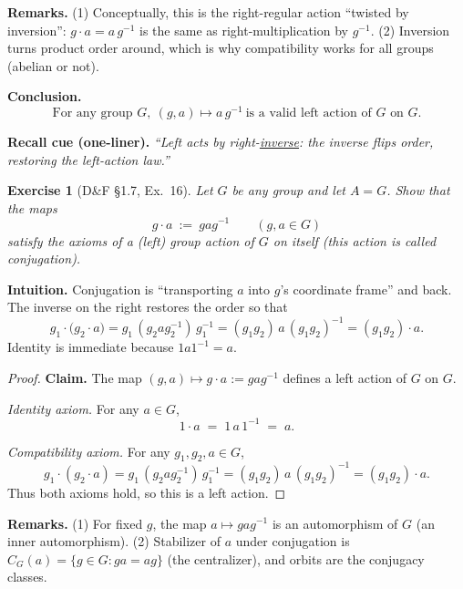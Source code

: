 \documentclass[12pt]{article}
\newtheorem{exercise}[theorem]{Exercise}
\theoremstyle{definition}
\begin{document}
\noindent\textbf{Remarks.}
(1) Conceptually, this is the right-regular action “twisted by inversion”:
$g\cdot a = a\,g^{-1}$ is the same as right-multiplication by $g^{-1}$.
(2) Inversion turns product order around, which is why compatibility works for all groups (abelian or not).

\medskip
\noindent\textbf{Conclusion.}
\[
\boxed{\ \text{For any group }G,\ (g,a)\mapsto a\,g^{-1}\ \text{is a valid left action of }G\text{ on }G.\ }
\]

\medskip
\noindent\textbf{Recall cue (one-liner).} \emph{“Left acts by right-\underline{inverse}: the inverse flips order, restoring the left-action law.”}

\newpage

\begin{exercise}[D\&F §1.7, Ex.~16]
Let $G$ be any group and let $A=G$. Show that the maps
\[
g\cdot a\ :=\ gag^{-1}\qquad(g,a\in G)
\]
satisfy the axioms of a (left) group action of $G$ on itself (this action is called \emph{conjugation}).
\end{exercise}

\dotfill

\noindent\textbf{Intuition.}
Conjugation is “transporting $a$ into $g$’s coordinate frame” and back. The inverse on the right restores the order so that
\[
g_1\cdot\bigl(g_2\cdot a\bigr)=g_1\,(g_2 a g_2^{-1})\,g_1^{-1}
=(g_1g_2)\,a\,(g_1g_2)^{-1}
=(g_1g_2)\cdot a.
\]
Identity is immediate because $1a1^{-1}=a$.

\dotfill

\begin{proof}
\noindent\textbf{Claim.} The map $(g,a)\mapsto g\cdot a:=gag^{-1}$ defines a left action of $G$ on $G$.

\smallskip
\noindent\emph{Identity axiom.} For any $a\in G$,
\[
1\cdot a \;=\; 1\,a\,1^{-1}\;=\;a.
\]

\smallskip
\noindent\emph{Compatibility axiom.} For any $g_1,g_2,a\in G$,
\[
g_1\cdot(g_2\cdot a)
= g_1\,(g_2 a g_2^{-1})\,g_1^{-1}
= (g_1g_2)\,a\,(g_1g_2)^{-1}
= (g_1g_2)\cdot a.
\]
Thus both axioms hold, so this is a left action.
\end{proof}

\noindent\textbf{Remarks.}
(1) For fixed $g$, the map $a\mapsto gag^{-1}$ is an automorphism of $G$ (an inner automorphism).
(2) Stabilizer of $a$ under conjugation is $C_G(a)=\{g\in G: ga=ag\}$ (the centralizer), and orbits are the conjugacy classes.
\end{document}
